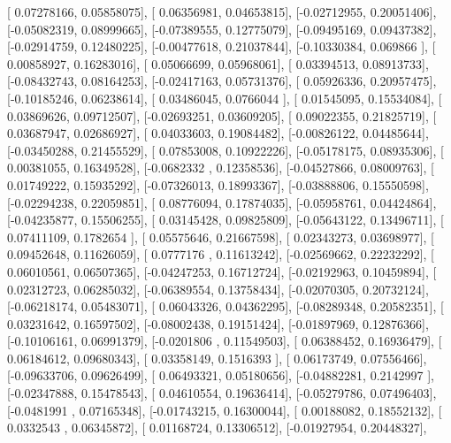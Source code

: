 \documentclass{article}
\begin{document}
       [ 0.07278166,  0.05858075],
       [ 0.06356981,  0.04653815],
       [-0.02712955,  0.20051406],
       [-0.05082319,  0.08999665],
       [-0.07389555,  0.12775079],
       [-0.09495169,  0.09437382],
       [-0.02914759,  0.12480225],
       [-0.00477618,  0.21037844],
       [-0.10330384,  0.069866  ],
       [ 0.00858927,  0.16283016],
       [ 0.05066699,  0.05968061],
       [ 0.03394513,  0.08913733],
       [-0.08432743,  0.08164253],
       [-0.02417163,  0.05731376],
       [ 0.05926336,  0.20957475],
       [-0.10185246,  0.06238614],
       [ 0.03486045,  0.0766044 ],
       [ 0.01545095,  0.15534084],
       [ 0.03869626,  0.09712507],
       [-0.02693251,  0.03609205],
       [ 0.09022355,  0.21825719],
       [ 0.03687947,  0.02686927],
       [ 0.04033603,  0.19084482],
       [-0.00826122,  0.04485644],
       [-0.03450288,  0.21455529],
       [ 0.07853008,  0.10922226],
       [-0.05178175,  0.08935306],
       [ 0.00381055,  0.16349528],
       [-0.0682332 ,  0.12358536],
       [-0.04527866,  0.08009763],
       [ 0.01749222,  0.15935292],
       [-0.07326013,  0.18993367],
       [-0.03888806,  0.15550598],
       [-0.02294238,  0.22059851],
       [ 0.08776094,  0.17874035],
       [-0.05958761,  0.04424864],
       [-0.04235877,  0.15506255],
       [ 0.03145428,  0.09825809],
       [-0.05643122,  0.13496711],
       [ 0.07411109,  0.1782654 ],
       [ 0.05575646,  0.21667598],
       [ 0.02343273,  0.03698977],
       [ 0.09452648,  0.11626059],
       [ 0.0777176 ,  0.11613242],
       [-0.02569662,  0.22232292],
       [ 0.06010561,  0.06507365],
       [-0.04247253,  0.16712724],
       [-0.02192963,  0.10459894],
       [ 0.02312723,  0.06285032],
       [-0.06389554,  0.13758434],
       [-0.02070305,  0.20732124],
       [-0.06218174,  0.05483071],
       [ 0.06043326,  0.04362295],
       [-0.08289348,  0.20582351],
       [ 0.03231642,  0.16597502],
       [-0.08002438,  0.19151424],
       [-0.01897969,  0.12876366],
       [-0.10106161,  0.06991379],
       [-0.0201806 ,  0.11549503],
       [ 0.06388452,  0.16936479],
       [ 0.06184612,  0.09680343],
       [ 0.03358149,  0.1516393 ],
       [ 0.06173749,  0.07556466],
       [-0.09633706,  0.09626499],
       [ 0.06493321,  0.05180656],
       [-0.04882281,  0.2142997 ],
       [-0.02347888,  0.15478543],
       [ 0.04610554,  0.19636414],
       [-0.05279786,  0.07496403],
       [-0.0481991 ,  0.07165348],
       [-0.01743215,  0.16300044],
       [ 0.00188082,  0.18552132],
       [ 0.0332543 ,  0.06345872],
       [ 0.01168724,  0.13306512],
       [-0.01927954,  0.20448327],
\end{document}
